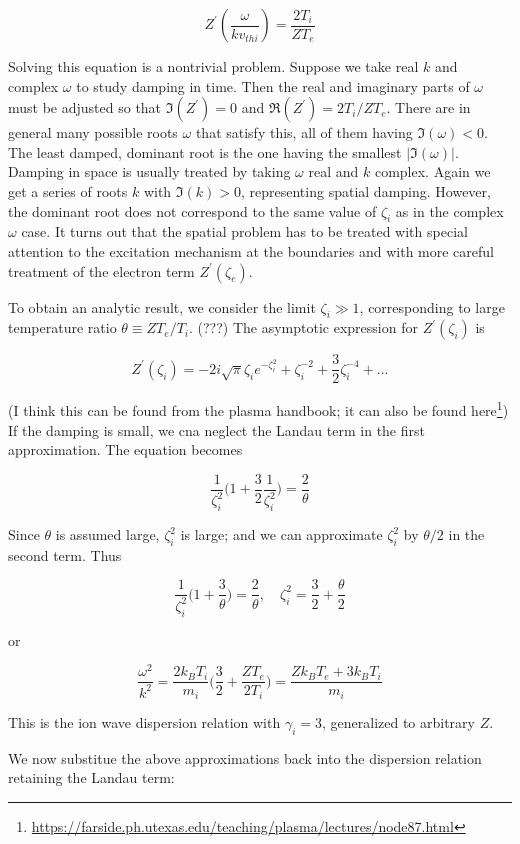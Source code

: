 \documentclass[
  notoc %
]{tufte-book}
\DeclareRobustCommand{\href}[2]{#2\footnote{\url{#1}}}
\begin{document}
\[
Z^\prime(\frac{\omega}{kv_{thi}}) = \frac{2T_i}{ZT_e}
\]

Solving this equation is a nontrivial problem. Suppose we take real
\(k\) and complex \(\omega\) to study damping in time. Then the real and
imaginary parts of \(\omega\) must be adjusted so that
\(\Im(Z^\prime)=0\) and \(\Re(Z^\prime) = 2T_i/ZT_e\). There are in
general many possible roots \(\omega\) that satisfy this, all of them
having \(\Im(\omega)<0\). The least damped, dominant root is the one
having the smallest \(|\Im(\omega)|\). Damping in space is usually
treated by taking \(\omega\) real and \(k\) complex. Again we get a
series of roots \(k\) with \(\Im(k)>0\), representing spatial damping.
However, the dominant root does not correspond to the same value of
\(\zeta_i\) as in the complex \(\omega\) case. It turns out that the
spatial problem has to be treated with special attention to the
excitation mechanism at the boundaries and with more careful treatment
of the electron term \(Z^\prime(\zeta_e)\).

To obtain an analytic result, we consider the limit \(\zeta_i \gg 1\),
corresponding to large temperature ratio \(\theta\equiv ZT_e/T_i\).
(???) The asymptotic expression for \(Z^\prime(\zeta_i)\) is

\[
Z^\prime(\zeta_i) = -2i\sqrt{\pi}\zeta_i e^{-\zeta_i^2} + \zeta_i^{-2} + \frac{3}{2}\zeta_i^{-4} + ...
\]

(I think this can be found from the plasma handbook; it can also be
found
\href{https://farside.ph.utexas.edu/teaching/plasma/lectures/node87.html}{here})
If the damping is small, we cna neglect the Landau term in the first
approximation. The equation becomes

\[
\frac{1}{\zeta_i^2}\Big( 1+\frac{3}{2}\frac{1}{\zeta_i^2} \Big) = \frac{2}{\theta}
\]

Since \(\theta\) is assumed large, \(\zeta_i^2\) is large; and we can
approximate \(\zeta_i^2\) by \(\theta/2\) in the second term. Thus

\[
\frac{1}{\zeta_i^2}\Big( 1+\frac{3}{\theta} \Big) = \frac{2}{\theta},\quad \zeta_i^2 = \frac{3}{2} + \frac{\theta}{2}
\]

or

\[
\frac{\omega^2}{k^2} = \frac{2k_B T_i}{m_i}\Big( \frac{3}{2} + \frac{ZT_e}{2T_i} \Big) = \frac{Zk_B T_e + 3k_B T_i}{m_i}
\]

This is the ion wave dispersion relation with \(\gamma_i=3\),
generalized to arbitrary \(Z\).

We now substitue the above approximations back into the dispersion
relation retaining the Landau term:
\end{document}
